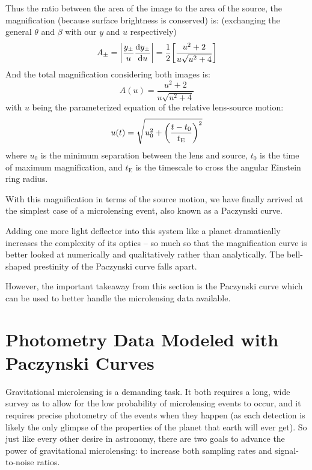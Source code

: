 \documentclass[12pt, a4paper]{article}
\begin{document}
Thus the ratio between the area of the image to the area of the source, the magnification (because surface brightness is conserved)
is: (exchanging the general $\theta$ and $\beta$ with our $y$ and $u$ respectively)
\[A_\pm = \abs{\frac{y_\pm}{u}\dv{y_\pm}{u}}
=\frac12\bqty{\frac{u^2+2}{u\sqrt{u^2+4}}}\]
And the total magnification considering both images is:
\[A(u)=\frac{u^2+2}{u\sqrt{u^2+4}}\]
with $u$ being the parameterized equation of the relative lens-source motion:
\[u(t)=\sqrt{u_0^2+\pqty{\frac{t-t_0}{t_\mathrm E}}^2}\]
where $u_0$ is the minimum separation between the lens and source, $t_0$ is the time of maximum magnification, and $t_\mathrm E$ is the timescale to cross the angular Einstein ring radius.

With this magnification in terms of the source motion, we have finally arrived at the simplest case of a microlensing event, also known as a Paczynski curve.\cite{gaudi}

Adding one more light deflector into this system like a planet dramatically increases the complexity of its optics -- so much so that the magnification curve is better looked at numerically and qualitatively rather than analytically.
The bell-shaped prestinity of the Paczynski curve falls apart.

However, the important takeaway from this section is the Paczynski curve which can be used to better handle the microlensing data available.



\section{Photometry Data Modeled with Paczynski Curves}

Gravitational microlensing is a demanding task. It both requires a long, wide survey as to allow for the low probability of microlensing events to occur, and it requires precise photometry of the events when they happen (as each detection is likely the only glimpse of the properties of the planet that earth will ever get). So just like every other desire in astronomy, there are two goals to advance the power of gravitational microlensing: to increase both sampling rates and signal-to-noise ratios.
\end{document}
